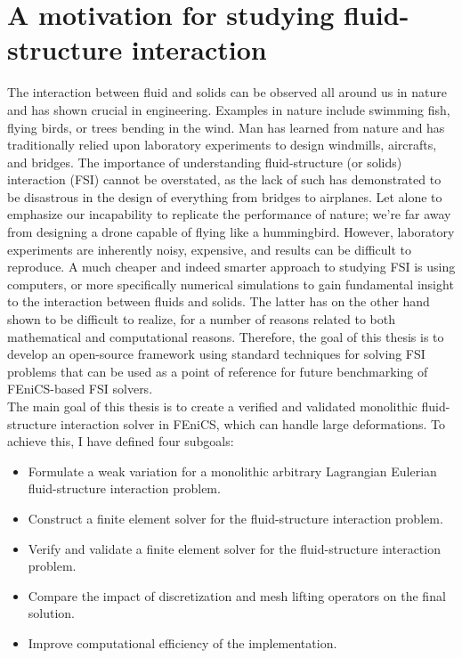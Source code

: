 \chapter*{A motivation for studying fluid-structure interaction}
The interaction between fluid and solids can be observed all around us in nature and has shown crucial in engineering. Examples in nature include swimming fish, flying birds, or trees bending in the wind. Man has learned from nature and has traditionally relied upon laboratory experiments to design windmills, aircrafts, and bridges. The importance of understanding fluid-structure (or solids) interaction (FSI) cannot be overstated, as the lack of such has demonstrated to be disastrous in the design of everything from bridges to airplanes. Let alone to emphasize our incapability to replicate the performance of nature; we're far away from designing a drone capable of flying like a hummingbird. However, laboratory experiments are inherently noisy, expensive, and results can be difficult to reproduce. A much cheaper and indeed smarter approach to studying FSI is using computers, or more specifically numerical simulations to gain fundamental insight to the interaction between fluids and solids. The latter has on the other hand shown to be difficult to realize, for a number of reasons related to both mathematical and computational reasons. Therefore, the goal of this thesis is to develop an open-source framework using standard techniques for solving FSI problems that can be used as a point of reference for future benchmarking of FEniCS-based FSI solvers. \\

The main goal of this thesis is to create a verified and validated monolithic fluid-structure interaction solver in FEniCS, which can handle large deformations. To achieve this, I have defined four subgoals: 

\begin{itemize}
\item Formulate a weak variation for a monolithic arbitrary Lagrangian Eulerian fluid-structure interaction problem.
\item Construct a finite element solver for the fluid-structure interaction problem.
\item Verify and validate a finite element solver for the fluid-structure interaction problem.
\item Compare the impact of discretization and mesh lifting operators on the final solution.
\item Improve computational efficiency of the implementation.
\end{itemize}

